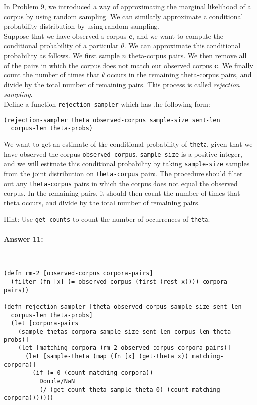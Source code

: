 \documentclass[12pt, letterpaper]{article}
\begin{document}
\noindent In Problem 9, we introduced a way of approximating the marginal
likelihood of a corpus by using random sampling. We can similarly
approximate a conditional probability distribution by using random
sampling.
\\

\noindent Suppose that we have observed a corpus $\mathbf{c}$, and we
want to compute the conditional probability of a particular
$\theta$. We can approximate this conditional probability as
follows. We first sample $n$ theta-corpus pairs. We then remove all of
the pairs in which the corpus does not match our observed corpus
$\mathbf{c}$. We finally count the number of times that $\theta$
occurs in the remaining theta-corpus pairs, and divide by the total
number of remaining pairs. This process is called \textit{rejection
  sampling}.
\\

\noindent 
Define a function \texttt{rejection-sampler} which has the following
form:
 
\begin{lstlisting}
(rejection-sampler theta observed-corpus sample-size sent-len
  corpus-len theta-probs)
\end{lstlisting}

\noindent We want to get an estimate of the conditional probability of
\texttt{theta}, given that we have observed the corpus
\texttt{observed-corpus}. \texttt{sample-size} is a positive integer,
and we will estimate this conditional probability by taking
\texttt{sample-size} samples from the joint distribution on
\texttt{theta-corpus} pairs. The procedure should filter out any
\texttt{theta-corpus} pairs in which the corpus does not equal the
observed corpus. In the remaining pairs, it should then count the
number of times that theta occurs, and divide by the total number of
remaining pairs.


\noindent Hint: Use \texttt{get-counts} to count the number of
occurrences of \texttt{theta}.

\paragraph{Answer 11:} ~\begin{lstlisting}
(defn rm-2 [observed-corpus corpora-pairs]
  (filter (fn [x] (= observed-corpus (first (rest x)))) corpora-pairs))

(defn rejection-sampler [theta observed-corpus sample-size sent-len 
  corpus-len theta-probs]
  (let [corpora-pairs 
    (sample-thetas-corpora sample-size sent-len corpus-len theta-probs)]
    (let [matching-corpora (rm-2 observed-corpus corpora-pairs)]
      (let [sample-theta (map (fn [x] (get-theta x)) matching-corpora)]
        (if (= 0 (count matching-corpora))
          Double/NaN
          (/ (get-count theta sample-theta 0) (count matching-corpora)))))))
\end{lstlisting}
\end{document}
